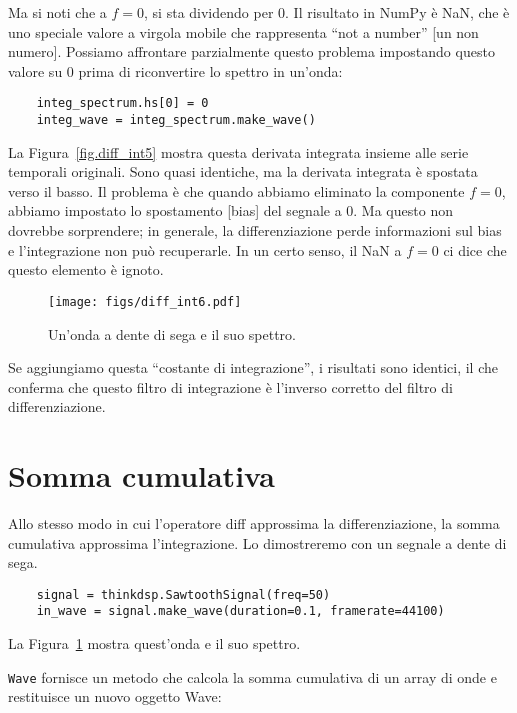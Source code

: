 \documentclass[12pt,a4paper]{book}
\begin{document}
Ma si noti che a $f=0$, si sta dividendo per 0. Il risultato in NumPy è NaN, che è uno speciale valore a virgola mobile che rappresenta ``not a number'' [un non numero]. Possiamo affrontare parzialmente questo problema impostando questo valore su 0 prima di riconvertire lo spettro in un'onda:

\begin{verbatim} 
    integ_spectrum.hs[0] = 0
    integ_wave = integ_spectrum.make_wave()
 \end{verbatim} 

La Figura~\ref{fig.diff_int5} mostra questa derivata integrata insieme alle serie temporali originali. Sono quasi identiche, ma la derivata integrata è spostata verso il basso. Il problema è che quando abbiamo eliminato la componente $f=0$, abbiamo impostato lo spostamento [bias] del segnale a 0. Ma questo non dovrebbe sorprendere; in generale, la differenziazione perde informazioni sul bias e l'integrazione non può recuperarle. In un certo senso, il NaN a $f=0$ ci dice che questo elemento è ignoto.

\begin{figure} 

\centerline{\texttt{[image: figs/diff\_int6.pdf]}} \caption{Un'onda a dente di sega e il suo spettro.} \label{fig.diff_int6} \end{figure} 

Se aggiungiamo questa ``costante di integrazione'', i risultati sono identici, il che conferma che questo filtro di integrazione è l'inverso corretto del filtro di differenziazione.

\section{Somma cumulativa} \label{cumsum} 

Allo stesso modo in cui l'operatore diff approssima la differenziazione, la somma cumulativa approssima l'integrazione. Lo dimostreremo con un segnale a dente di sega.

\begin{verbatim} 
    signal = thinkdsp.SawtoothSignal(freq=50)
    in_wave = signal.make_wave(duration=0.1, framerate=44100)
 \end{verbatim} 

La Figura~\ref{fig.diff_int6} mostra quest'onda e il suo spettro.

{\tt Wave} fornisce un metodo che calcola la somma cumulativa di un array di onde e restituisce un nuovo oggetto Wave:
\end{document}
